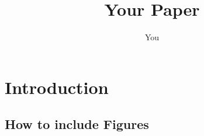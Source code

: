 \documentclass[a4paper, uplatex]{jsarticle} %
\title{Your Paper}
\author{You}
\begin{document}
\maketitle

\begin{abstract}
\end{abstract}

\section{Introduction}

\subsection{How to include Figures}
\end{document}
